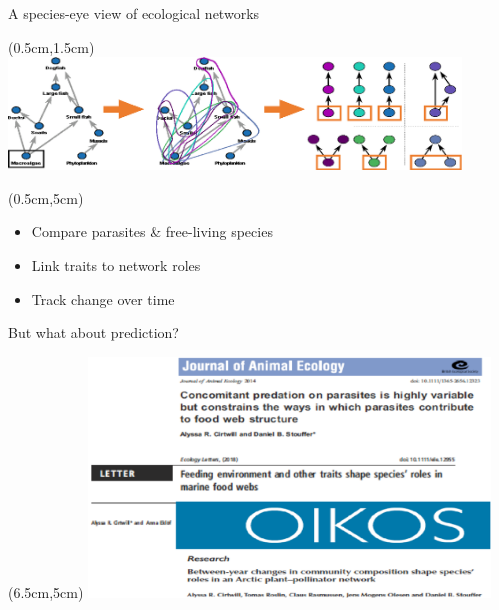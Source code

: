 \documentclass{beamer}
\begin{document}
  \begin{frame}{A species-eye view of ecological networks}

    \begin{textblock*}{12cm}(0.5cm,1.5cm)
      \includegraphics[width=12cm]{intro_figs/role_breakdown.eps}
      \end{textblock*} 

    \begin{textblock*}{6cm}(0.5cm,5cm)
      \begin{itemize}
        \item Compare parasites \& free-living species
        \item Link traits to network roles
        \item Track change over time
      \end{itemize}

      \vspace{.5cm}
      {\color{DarkBlue}But what about prediction?}

      \end{textblock*} 

    \begin{textblock*}{6cm}(6.5cm,5cm)
        \includegraphics[width=0.8\textwidth]{intro_figs/paperstack.eps}
      \end{textblock*} 

    \end{frame}
\end{document}
